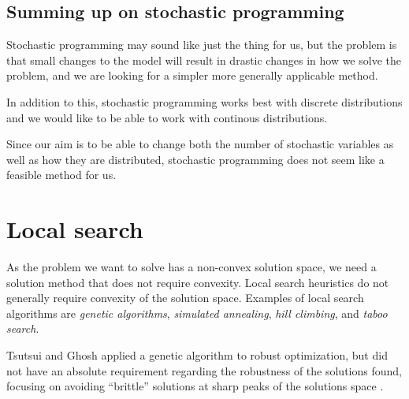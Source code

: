 \subsection{Summing up on stochastic programming}

Stochastic programming may sound like just the thing for us, but the
problem is that small changes to the model will result in drastic
changes in how we solve the problem, and we are looking for a simpler
more generally applicable method.

In addition to this, stochastic programming works best with discrete
distributions and we would like to be able to work with continous
distributions.  

Since our aim is to be able to change both the number
of stochastic variables as well as how they are distributed,
stochastic programming does not seem like a feasible method for us.


\section{Local search}
As the problem we want to solve has a non-convex solution space, we
need a solution method that does not require convexity. Local search
heuristics do not generally require convexity of the solution space.
Examples of local search algorithms are \emph{genetic algorithms},
\emph{simulated annealing}, \emph{hill climbing}, and \emph{taboo search}.

Tsutsui and Ghosh applied a genetic algorithm to robust optimization,
but did not have an absolute requirement regarding the robustness of
the solutions found, focusing on avoiding ``brittle'' solutions at
sharp peaks of the solutions space \cite{tsutsui}.

